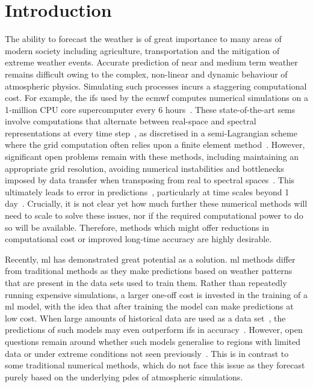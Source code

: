 \documentclass[aps,pra,a4paper,twocolumn,longbibliography,groupedaddress]{revtex4-2}
\begin{document}

\section{Introduction} \label{sec:introduction} 

The ability to forecast the weather is of great importance to many areas of modern society including agriculture, transportation and the mitigation of extreme weather events. Accurate prediction of near and medium term weather remains difficult owing to the complex, non-linear and dynamic behaviour of atmospheric physics. Simulating such processes incurs a staggering computational cost. For example, the \gls{ifs} used by the \gls{ecmwf} computes numerical simulations on a 1-million CPU core supercomputer every 6 hours~\cite{ecmwfFactSheet, ecmwfMediumrangeForecasts}. 
{These state-of-the-art \glspl{sem} involve computations that alternate between real-space and spectral representations at every time step~\cite{orszag1970transform, eliasen1970numerical}, as discretised in a semi-Lagrangian scheme~\cite{hortal2002development} where the grid computation often relies upon a finite element method~\cite{vivoda2018finite}. However, significant open problems remain with these methods, including maintaining an appropriate grid resolution, avoiding numerical instabilities and bottlenecks imposed by data transfer when transposing from real to spectral spaces~\cite{wedi2014increasing}. This ultimately leads to error in predictions~\cite{grams2018atmospheric}, particularly at time scales beyond 1 day~\cite{lavers2019forecast, han2021deep}. Crucially, it is not clear yet how much further these numerical methods will need to scale to solve these issues, nor if the required computational power to do so will be available. Therefore, methods which might offer reductions in computational cost or improved long-time accuracy are highly desirable.}

Recently, \gls{ml} has demonstrated great potential as a solution. \gls{ml} methods differ from traditional methods as they make predictions based on weather patterns that are present in the data sets used to train them. Rather than repeatedly running expensive simulations, a larger one-off cost is invested in the training of a \gls{ml} model, with the idea that after training the model can make predictions at low cost. When large amounts of historical data are used as a data set~\cite{nguyen2023climax}, the predictions of such models may even outperform \gls{ifs} in accuracy~\cite{bi2022pangu, chen2023fuxi}.
However, open questions remain around whether such models generalise to regions with limited data or under extreme conditions not seen previously~\cite{reichstein2019deep}. This is in contrast to some traditional numerical methods, which do not face this issue as they forecast purely based on the underlying \glspl{pde} of atmospheric simulations.
  
\end{document}
